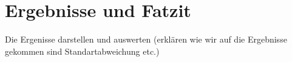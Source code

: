 \section*{Ergebnisse und Fatzit}
Die Ergenisse darstellen und auswerten (erklären wie wir auf die Ergebnisse gekommen sind Standartabweichung etc.)